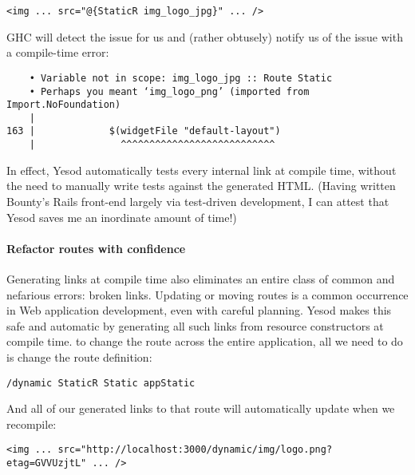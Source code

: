 \begin{Verbatim}
<img ... src="@{StaticR img_logo_jpg}" ... />
\end{Verbatim}

GHC will detect the issue for us and (rather obtusely) notify us of the issue with a compile-time error:

\begin{Verbatim}
    • Variable not in scope: img_logo_jpg :: Route Static
    • Perhaps you meant ‘img_logo_png’ (imported from Import.NoFoundation)
    |
163 |             $(widgetFile "default-layout")
    |               ^^^^^^^^^^^^^^^^^^^^^^^^^^^
\end{Verbatim}

In effect, Yesod automatically tests every internal link at compile time, without the need to manually write tests against the generated HTML. (Having written Bounty's Rails front-end largely via test-driven development, I can attest that Yesod saves me an inordinate amount of time!)

\paragraph{Refactor routes with confidence} Generating links at compile time also eliminates an entire class of common and nefarious errors: broken links. Updating or moving routes is a common occurrence in Web application development, even with careful planning. Yesod makes this safe and automatic by generating all such links from resource constructors at compile time. to change the route across the entire application, all we need to do is change the route definition:

\begin{Verbatim}
/dynamic StaticR Static appStatic
\end{Verbatim}

And all of our generated links to that route will automatically update when we recompile:

\begin{Verbatim}
<img ... src="http://localhost:3000/dynamic/img/logo.png?etag=GVVUzjtL" ... />
\end{Verbatim}


